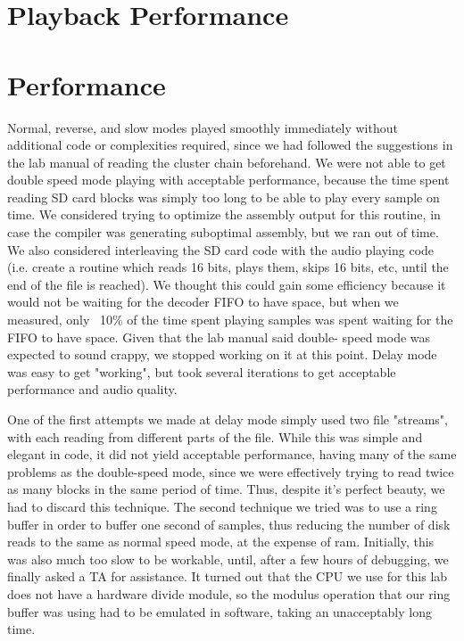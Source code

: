 \documentclass[12pt]{article}
\begin{document}
\section{Playback Performance}
\section{Performance}
Normal, reverse, and slow modes played smoothly immediately without additional
code or complexities required, since we had followed the suggestions in the
lab manual of reading the cluster chain beforehand. We were not able to get
double speed mode playing with acceptable performance, because the time spent
reading SD card blocks was simply too long to be able to play every sample on
time. We considered trying to optimize the assembly output for this routine,
in case the compiler was generating suboptimal assembly, but we ran out of
time. We also considered interleaving the SD card code with the audio playing
code (i.e. create a routine which reads 16 bits, plays them, skips 16 bits,
etc, until the end of the file is reached). We thought this could gain some
efficiency because it would not be waiting for the decoder FIFO to have space,
but when we measured, only ~10\% of the time spent playing samples was spent
waiting for the FIFO to have space. Given that the lab manual said double-
speed mode was expected to sound crappy, we stopped working on it at this
point. Delay mode was easy to get "working", but took several iterations to
get acceptable performance and audio quality.

One of the first attempts we made at delay mode simply used two file "streams",
with each reading from different parts of the file. While this was simple and
elegant in code, it did not yield acceptable performance, having many of the
same problems as the double-speed mode, since we were effectively trying to
read twice as many blocks in the same period of time. Thus, despite it's
perfect beauty, we had to discard this technique. The second technique we tried
was to use a ring buffer in order to buffer one second of samples, thus
reducing the number of disk reads to the same as normal speed mode, at the
expense of ram. Initially, this was also much too slow to be workable, until,
after a few hours of debugging, we finally asked a TA for assistance. It turned
out that the CPU we use for this lab does not have a hardware divide module,
so the modulus operation that our ring buffer was using had to be emulated in
software, taking an unacceptably long time.
\end{document}
